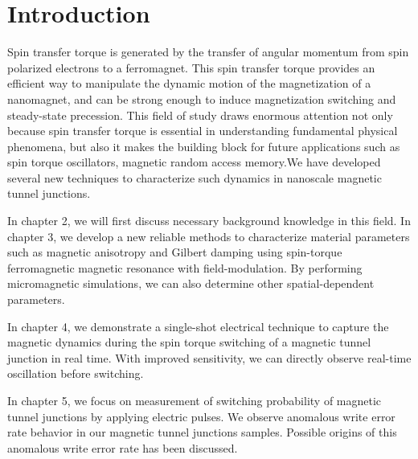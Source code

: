 \chapter{Introduction}

  Spin transfer torque is generated by the transfer of angular momentum from spin polarized electrons to a ferromagnet. This spin transfer torque provides an efficient way to manipulate the dynamic motion of the magnetization of a nanomagnet, and can be strong enough to induce magnetization switching and steady-state precession. This field of study draws enormous attention not only because spin transfer torque is essential in understanding fundamental physical phenomena, but also it makes the building block for future applications such as spin torque oscillators, magnetic random access memory.We have developed several new techniques to characterize such dynamics in nanoscale magnetic tunnel junctions.
  
  In chapter 2, we will first discuss necessary background  knowledge in this field. In chapter 3, we develop a new reliable methods to characterize material parameters such as magnetic anisotropy and Gilbert damping using spin-torque ferromagnetic magnetic resonance with field-modulation. By performing micromagnetic simulations, we can also determine other spatial-dependent parameters.
  
  In chapter 4, we demonstrate a single-shot electrical technique to capture the magnetic dynamics during the spin torque switching of a magnetic tunnel junction in real time. With improved sensitivity, we can directly observe real-time oscillation before switching.
  
  In chapter 5, we focus on measurement of switching probability of magnetic tunnel junctions by applying electric pulses. We observe anomalous write error rate behavior in our magnetic tunnel junctions samples. Possible origins of this anomalous write error rate has been discussed.


